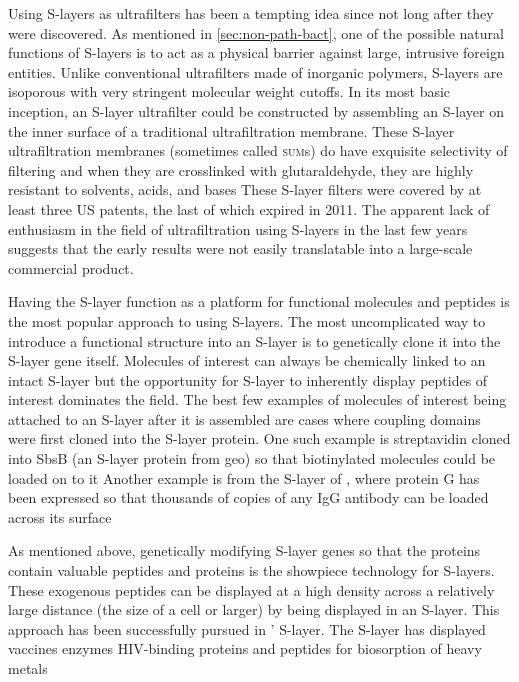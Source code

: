   Using \acp{S-layer} as ultrafilters has been a tempting idea since not long after they were discovered. As mentioned in \cref{sec:non-path-bact}, one of the possible natural
functions of \acp{S-layer} is to act as a physical barrier against large, intrusive foreign entities. Unlike conventional ultrafilters made of inorganic polymers, \acp{S-layer} are
isoporous with very stringent molecular weight cutoffs. In its most basic inception, an \ac{S-layer} ultrafilter could be constructed by assembling an \ac{S-layer} on the inner
surface of a traditional ultrafiltration membrane. These \ac{S-layer} ultrafiltration membranes (sometimes called \textsc{sum}s) do have exquisite selectivity of filtering and when
they are crosslinked with glutaraldehyde, they are highly resistant to solvents, acids, and bases These \ac{S-layer} filters were covered by at least
three US patents, the last of which expired in 2011. The apparent lack of enthusiasm in the field of ultrafiltration using \acp{S-layer} in the last few years suggests that the
early results were not easily translatable into a large-scale commercial product.
  
 Having the \ac{S-layer} function as a platform for functional molecules and peptides is the most popular approach to using \acp{S-layer}. The most uncomplicated way to introduce
a functional structure into an \ac{S-layer} is to genetically clone it into the \ac{S-layer} gene itself. Molecules of interest can always be chemically linked to an intact
\ac{S-layer} but the opportunity for \ac{S-layer} to inherently display peptides of interest dominates the field. The best few examples of molecules
of interest being attached to an \ac{S-layer} after it is assembled are cases where coupling domains were first cloned into the \ac{S-layer} protein. One such example is
streptavidin cloned into SbsB (an \ac{S-layer} protein from \ac{geo}) so that biotinylated molecules could be loaded on to it Another example is from the
\ac{S-layer} of \caulobacter{}, where protein G has been expressed so that thousands of copies of any IgG antibody can be loaded across its surface

  As mentioned  above, genetically modifying \ac{S-layer} genes so that the proteins contain valuable peptides and proteins is the showpiece technology for \acp{S-layer}. These
exogenous peptides can be displayed at a high density across a relatively large
distance (\eg the size of a cell or larger) by being displayed in an \ac{S-layer}. This approach has been successfully
pursued in \caulobacter{}' \ac{S-layer}. The \caulobacter{} \ac{S-layer} has displayed vaccines enzymes HIV-binding
proteins and peptides for biosorption of heavy metals

